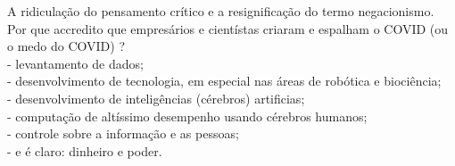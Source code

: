 \documentclass[11pt]{book}
\begin{document}
A ridiculação do pensamento crítico e a resignificação do termo negacionismo. \\

Por que accredito que empresários e cientístas criaram e espalham o COVID (ou o medo do COVID) ? \\

- levantamento de dados; \\
- desenvolvimento de tecnologia, em especial nas áreas de robótica e biociência; \\
- desenvolvimento de inteligências (cérebros) artificias; \\
- computação de altíssimo desempenho usando cérebros humanos; \\
- controle sobre a informação e as pessoas; \\
- e é claro: dinheiro e poder.
\end{document}
